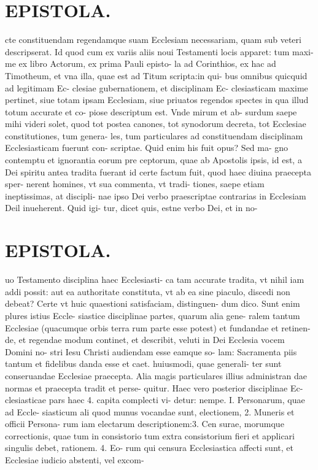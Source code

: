 \documentclass{article}
\begin{document}
\begin{pages}
\section*{EPISTOLA. }cte constituendam regendamque suam Ecclesiam necessariam, quam sub veteri descripserat. Id quod cum ex variis aliis noui Testamenti locis apparet: tum maxi- me ex libro Actorum, ex prima Pauli episto- la ad Corinthios, ex hac ad Timotheum, et vna illa, quae est ad Titum scripta:in qui- bus omnibus quicquid ad legitimam Ec- clesiae gubernationem, et disciplinam Ec- clesiasticam maxime pertinet, siue totam ipsam Ecclesiam, siue priuatos regendos spectes in qua illud totum accurate et co- piose descriptum est. Vnde mirum et ab- surdum saepe mihi videri solet, quod tot postea canones, tot synodorum decreta, tot Ecclesiae constitutiones, tum genera- les, tum particulares ad constituendam disciplinam Ecclesiasticam fuerunt con- scriptae. Quid enim his fuit opus? Sed ma- gno contemptu et ignorantia eorum pre ceptorum, quae ab Apostolis ipsis, id est, a Dei spiritu antea tradita fuerant id certe factum fuit, quod haec diuina praecepta sper- nerent homines, vt sua commenta, vt tradi- tiones, saepe etiam ineptissimas, at discipli- nae ipso Dei verbo praescriptae contrarias in Ecclesiam Deil inueherent. Quid igi- tur, dicet quis, estne verbo Dei, et in no- 
\section*{EPISTOLA. }uo Testamento disciplina haec Ecclesiasti- ca tam accurate tradita, vt nihil iam addi possit: aut ea authoritate constituta, vt ab ea sine piaculo, discedi non debeat? Certe vt huic quaestioni satisfaciam, distinguen- dum dico. Sunt enim plures istius Eccle- siastice disciplinae partes, quarum alia gene- ralem tantum Ecclesiae (quacumque orbis terra rum parte esse potest) et fundandae et retinen- de, et regendae modum continet, et describit, veluti in Dei Ecclesia vocem Domini no- stri Iesu Christi audiendam esse eamque so- lam: Sacramenta piis tantum et fidelibus danda esse et caet. huiusmodi, quae generali- ter sunt conseruandae Ecclesiae praecepta. Alia magis particulares illius administran dae normas et praecepta tradit et perse- quitur. Haec vero posterior disciplinae Ec- clesiasticae pars haec 4. capita complecti vi- detur: nempe. I. Personarum, quae ad Eccle- siasticum ali quod munus vocandae sunt, electionem, 2. Muneris et officii Persona- rum iam electarum descriptionem:3. Cen surae, morumque correctionis, quae tum in consistorio tum extra consistorium fieri et applicari singulis debet, rationem. 4. Eo- rum qui censura Ecclesiastica affecti sunt, et Ecclesiae iudicio abstenti, vel excom- 

\end{pages}
\end{document}
